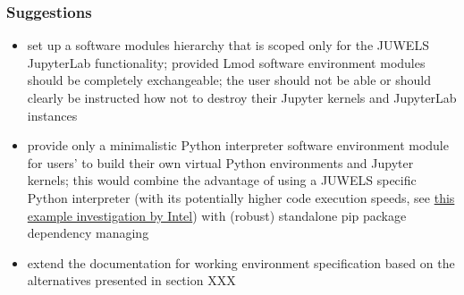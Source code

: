 \documentclass[11pt,a4paper]{article}
\begin{document}
\subsubsection{Suggestions}

\begin{itemize}

  \item set up a software modules hierarchy that is scoped only for the JUWELS JupyterLab functionality;
  provided Lmod software environment modules should be completely exchangeable;
  the user should not be able or should clearly be instructed how not to destroy their Jupyter kernels and JupyterLab instances

  \item provide only a minimalistic Python interpreter software environment module for users' to build their own virtual Python environments and Jupyter kernels;
  this would combine the advantage of using a JUWELS specific Python interpreter (with its potentially higher code execution speeds, see  \href{https://www.fz-juelich.de/SharedDocs/Downloads/IAS/JSC/EN/slides/supercomputer-ressources-2019-11/15a-tuning_intel.html}{this example investigation by Intel}) with (robust) standalone pip package dependency managing

  \item extend the documentation for working environment specification based on the alternatives presented in section XXX

\end{itemize}





\end{document}
